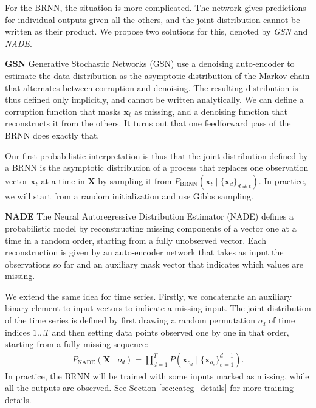 \documentclass{article}
\begin{document}
For the BRNN, the situation is more complicated. The network gives 
predictions for individual outputs given all the others, and the joint 
distribution cannot be written as their product. We propose two solutions for 
this, denoted by \emph{GSN} and \emph{NADE}.

{\bf GSN}
Generative Stochastic Networks (GSN) \citep{bengio2013generalized} use a denoising 
auto-encoder to estimate the data distribution
as the asymptotic distribution of the Markov chain that alternates between 
corruption and denoising.
The resulting distribution is thus defined only implicitly, and cannot be written analytically.
We can define a corruption function that masks $\mathbf{x}_{t}$ as missing, 
and a denoising function that reconstructs it from the others. It turns out 
that one feedforward pass of the BRNN does exactly that.

Our first probabilistic interpretation is thus that the joint distribution 
defined by a BRNN is the asymptotic distribution of a process that 
replaces one observation vector $\mathbf{x}_{t}$ at a time in $\mathbf{X}$ by 
sampling it from $P_{\mathrm{BRNN}}(\mathbf{x}_{t} \mid \{\mathbf{x}_d\}_{d\neq t})$. In 
practice, we will start from a random initialization and use Gibbs sampling.

{\bf NADE}
The Neural Autoregressive Distribution Estimator (NADE) 
\citep{uria2014deep} defines a probabilistic model by reconstructing missing 
components of a vector one at a time in a random order, starting from a fully 
unobserved vector. Each reconstruction is given by an auto-encoder network that 
takes as input the observations so far and an auxiliary mask vector that 
indicates which values are missing.

We extend the same idea for time series. Firstly, we concatenate an auxiliary 
binary element to input vectors to indicate a missing input. The joint 
distribution of the time series is defined by first drawing a random permutation 
$o_d$ of time indices $1\dots T$ and then setting data points observed one 
by one in that order, starting from a fully missing sequence: 
\begin{align}
P_{\mathrm{NADE}}(\mathbf{X}\mid o_d) = \prod_{d=1}^T P(\mathbf{x}_{o_d} \mid \{\mathbf{x}_{o_{e}}\}_{e=1}^{d-1}).
\end{align}
In practice, the BRNN will be trained with some inputs marked as missing, while 
all the outputs are observed. See Section \ref{sec:categ_details} for more training details.

\end{document}
